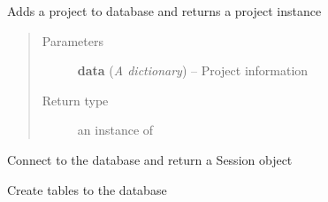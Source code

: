 \documentclass[letterpaper,10pt,english]{sphinxmanual}
\begin{document}

\begin{fulllineitems}
\label{controller:controller.AddProject}
Adds a project to database and returns a  project instance
\begin{quote}\begin{description}
\item[{Parameters}] \leavevmode
\textbf{data} (\emph{A dictionary}) -- Project information

\item[{Return type}] \leavevmode
an instance of {\hyperref[models:models.Project]{}}

\end{description}\end{quote}

\end{fulllineitems}


\begin{fulllineitems}
\label{controller:controller.ConnectToDatabase}
Connect to the database and return a Session object

\end{fulllineitems}


\begin{fulllineitems}
\label{controller:controller.CreateAll}
Create tables to the database

\end{fulllineitems}

\end{document}
